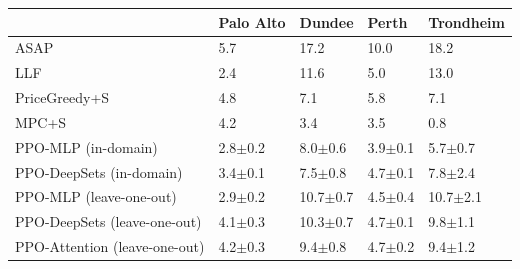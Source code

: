 \begin{tabular}{lllll}
\toprule
 & Palo Alto & Dundee & Perth & Trondheim \\
\midrule
ASAP & 5.7 & 17.2 & 10.0 & 18.2 \\
LLF & 2.4 & 11.6 & 5.0 & 13.0 \\
PriceGreedy+S & 4.8 & 7.1 & 5.8 & 7.1 \\
MPC+S & 4.2 & 3.4 & 3.5 & 0.8 \\
PPO-MLP (in-domain) & 2.8$\pm$0.2 & 8.0$\pm$0.6 & 3.9$\pm$0.1 & 5.7$\pm$0.7 \\
PPO-DeepSets (in-domain) & 3.4$\pm$0.1 & 7.5$\pm$0.8 & 4.7$\pm$0.1 & 7.8$\pm$2.4 \\
PPO-MLP (leave-one-out) & 2.9$\pm$0.2 & 10.7$\pm$0.7 & 4.5$\pm$0.4 & 10.7$\pm$2.1 \\
PPO-DeepSets (leave-one-out) & 4.1$\pm$0.3 & 10.3$\pm$0.7 & 4.7$\pm$0.1 & 9.8$\pm$1.1 \\
PPO-Attention (leave-one-out) & 4.2$\pm$0.3 & 9.4$\pm$0.8 & 4.7$\pm$0.2 & 9.4$\pm$1.2 \\
\bottomrule
\end{tabular}

